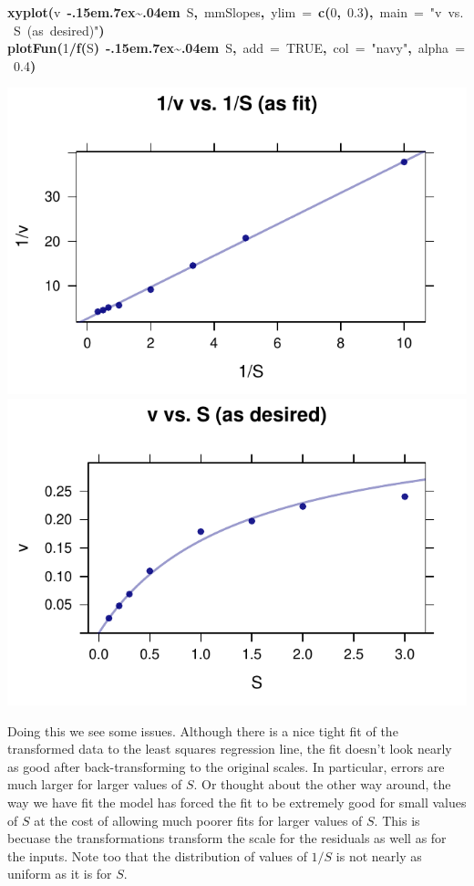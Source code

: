 \documentclass{article}
\makeatletter
\newcommand{\hlnumber}[1]{\textcolor[rgb]{0,0,0}{#1}}%
\newcommand{\hlfunctioncall}[1]{\textcolor[rgb]{0.501960784313725,0,0.329411764705882}{\textbf{#1}}}%
\newcommand{\hlstring}[1]{\textcolor[rgb]{0.6,0.6,1}{#1}}%
\newcommand{\hlkeyword}[1]{\textcolor[rgb]{0,0,0}{\textbf{#1}}}%
\newcommand{\hlargument}[1]{\textcolor[rgb]{0.690196078431373,0.250980392156863,0.0196078431372549}{#1}}%
\newcommand{\hlsymbol}[1]{\textcolor[rgb]{0,0,0}{#1}}%
\def\urltilda{\kern -.15em\lower .7ex\hbox{\~{}}\kern .04em}%
\newcommand{\hlstd}[1]{\textcolor[rgb]{0,0,0}{#1}}%
\newenvironment{kframe}{%
 \def\FrameCommand##1{\hskip\@totalleftmargin \hskip-\fboxsep
 \colorbox{shadecolor}{##1}\hskip-\fboxsep
     \hskip-\linewidth \hskip-\@totalleftmargin \hskip\columnwidth}%
 \MakeFramed {\advance\hsize-\width
   \@totalleftmargin\z@ \linewidth\hsize
   \@setminipage}}%
 {\par\unskip\endMakeFramed}
\newenvironment{knitrout}{}{} %
\makeatother
\begin{document}
\begin{knitrout}
\begin{kframe}
\begin{flushleft}
\hlstd{}\hlfunctioncall{xyplot}\hlkeyword{(}\hlsymbol{v}{\ }\hlkeyword{\urltilda{}}{\ }\hlsymbol{S}\hlkeyword{,}{\ }\hlsymbol{mmSlopes}\hlkeyword{,}{\ }\hlargument{ylim}{\ }\hlargument{=}{\ }\hlfunctioncall{c}\hlkeyword{(}\hlnumber{0}\hlkeyword{,}{\ }\hlnumber{0.3}\hlkeyword{)}\hlkeyword{,}{\ }\hlargument{main}{\ }\hlargument{=}{\ }\hlstring{"{}v{\ }vs.{\ }S{\ }(as{\ }desired)"{}}\hlkeyword{)}\hspace*{\fill}\\
\hlstd{}\hlfunctioncall{plotFun}\hlkeyword{(}\hlnumber{1}\hlkeyword{/}\hlfunctioncall{f}\hlkeyword{(}\hlsymbol{S}\hlkeyword{)}{\ }\hlkeyword{\urltilda{}}{\ }\hlsymbol{S}\hlkeyword{,}{\ }\hlargument{add}{\ }\hlargument{=}{\ }\hlnumber{TRUE}\hlkeyword{,}{\ }\hlargument{col}{\ }\hlargument{=}{\ }\hlstring{"{}navy"{}}\hlkeyword{,}{\ }\hlargument{alpha}{\ }\hlargument{=}{\ }\hlnumber{0.4}\hlkeyword{)}\mbox{}
\normalfont
\end{flushleft}
\end{kframe}

{\centering \includegraphics[width=.47\textwidth]{figures/modeling-mmModel1} \includegraphics[width=.47\textwidth]{figures/modeling-mmModel2} 

}


\end{knitrout}


Doing this we see some issues.  Although there is a nice tight fit of the transformed 
data to the least squares regression line, the fit doesn't look nearly as good after 
back-transforming to the original scales.  In particular, errors are much larger for larger
values of $S$.  Or thought about the other way around, the way we have fit the model 
has forced the fit to be extremely good for small values of $S$ at the cost of allowing
much poorer fits for larger values of $S$.  This is becuase the transformations
transform the scale for the residuals as well as for the inputs.  Note too that the distribution of values of $1/S$ is not nearly as uniform as it is for $S$.
\end{document}
